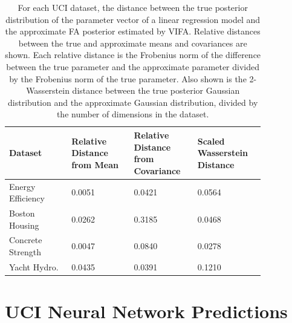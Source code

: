 \documentclass[msc,deptreport.inf]{infthesis} %
\begin{document}
\begin{table}[h!]
	\begin{center}
		\begin{tabular}{|| p{0.21\linewidth} p{0.21\linewidth} p{0.21\linewidth} p{0.21\linewidth} ||} 
 			\hline
 			Dataset & Relative Distance from Mean & Relative Distance from Covariance & Scaled Wasserstein Distance \\ [0.5ex] 
 			\hline\hline
			Energy Efficiency 	& 0.0051 	& 0.0421 & 0.0564 \\ 
			\hline
			Boston Housing 	& 0.0262 	& 0.3185 & 0.0468 \\ 
			\hline
			Concrete Strength 	& 0.0047 	& 0.0840 & 0.0278 \\ 
			\hline
 			Yacht Hydro. 		& 0.0435 	& 0.0391 & 0.1210 \\ [1ex] 
			\hline
		\end{tabular}
		\caption{For each UCI dataset, the distance between the true posterior distribution of the parameter vector of a linear regression model and the approximate FA posterior estimated by VIFA. Relative distances between the true and approximate means and covariances are shown. Each relative distance is the Frobenius norm of the difference between the true parameter and the approximate parameter divided by the Frobenius norm of the true parameter. Also shown is the 2-Wasserstein distance between the true posterior Gaussian distribution and the approximate Gaussian distribution, divided by the number of dimensions in the dataset.}
		\label{table:linear_regression_vi_posterior_uci}
	\end{center}
\end{table}

\section{UCI Neural Network Predictions}\label{app:uci_nn_predictions}
\end{document}
